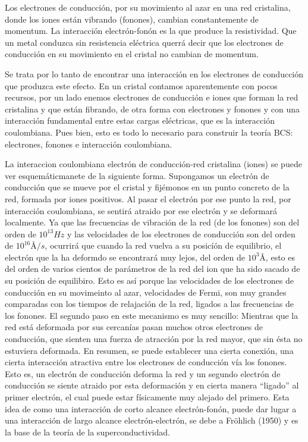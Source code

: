 Los electrones de conducción, por su movimiento al azar en una red cristalina, donde los iones están vibrando (fonones), cambian constantemente de momentum. La interacción electrón-fonón es la que produce la resistividad. Que un metal conduzca sin resistencia eléctrica querrá decir que los electrones de conducción en su movimiento en el cristal no cambian de momentum.

Se trata por lo tanto de encontrar una interacción en los electrones de conducción que produzca este efecto. En un cristal contamos aparentemente con pocos recursos, por un lado enemos electrones de conducción e iones que forman la red cristalina y que están fibrando, de otra forma con electrones y fonones y con una interacción fundamental entre estas cargas eléctricas, que es la interacción coulombiana. Pues bien, esto es todo lo necesario para construir la teoría BCS: electrones, fonones e interacción coulombiana.

La interaccion coulombiana electrón de conducción-red cristalina (iones) se puede ver esquemáticmanete de la siguiente forma. Supongamos un electrón de conducción que se mueve por el cristal y fijémonos en un punto concreto de la red, formada por iones positivos. Al pasar el electrón por ese punto la red, por interacción coulombiana, se sentirá atraido por ese electrón y se deformará localmente. Ya que las frecuencias de vibración de la red (de los fonones) son del orden de $10^{13} Hz$ y las velocidades de los electrones de conducción son del orden de $10^{16} Å/s$, ocurrirá que cuando la red vuelva a su posicíón de equilibrio, el electrón que la ha deformdo se encontrará muy lejos, del orden de $10^3 Å$, esto es del orden de varios cientos de parámetros de la red del ion que ha sido sacado de su posición de equilibiro. Esto es así porque las velocidades de los electrones de conducción en su movimeinto al azar, velocidades de Fermi, son muy grandes comparadas con los tiempos de relajación de la red, ligados a las frecuencias de los fonones. El segundo paso en este mecanismo es muy sencillo: Mientras que la red está deformada por sus cercanías pasan muchos otros electrones de conducción, que sienten una fuerza de atracción por la red mayor, que sin ésta no estuviera deformada. En resumen, se puede establecer una cierta conexión, una cierta interacción atractiva entre los electrones de conducción vía los fonones. Esto es, un electrón de conducción deforma la red y un segundo electrón de conducción se siente atraido por esta deformación y en cierta manera ``ligado'' al primer electrón, el cual puede estar físicamente muy alejado del primero. Esta idea de como una interacción de corto alcance electrón-fonón, puede dar lugar a una interacción de largo alcance electrón-electrón, se debe a Fröhlich (1950) \cite{frohlich} y es la base de la teoría de la superconductividad.

